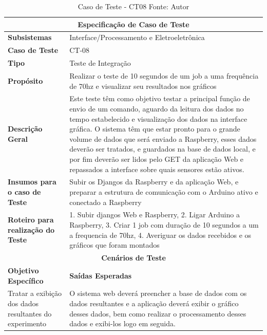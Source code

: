 \begin{table}[H]
    \begin{center}
        \begin{tabular}{|p{5cm}|p{12cm}|}
            \hline
            \multicolumn{2}{|c|}{\textbf{Especificação de Caso de Teste}} \\ \hline
                \textbf{Subsistemas}                               &  Interface/Processamento e Eletroeletrônica  \\ \hline
                \textbf{Caso de Teste}                             & CT-08 \\ \hline
                \textbf{Tipo}                                             & Teste de Integração \\ \hline
                \textbf{Propósito}                                     & Realizar o teste de 10 segundos de um job a uma frequência de 70hz e visualizar seu resultados nos gráficos \\ \hline
                \textbf{Descrição Geral}                           & Este teste têm como objetivo testar a principal função de envio de um comando, aguardo da leitura dos dados no tempo estabelecido e visualização dos dados na interface gráfica. O sistema têm que estar pronto para o grande volume de dados que será enviado a Raspberry, esses dados deverão ser tratados, e guardados na base de dados local, e por fim deverão ser lidos pelo GET da aplicação Web e repassados a interface sobre quais sensores estão ativos. \\ \hline
                \textbf{Insumos para o caso de Teste}    & Subir os Djangos da Raspberry e da aplicação Web, e preparar a estrutura de comunicação com o Arduino ativo e conectado a Raspberry \\ \hline
                \textbf{Roteiro para realização do Teste}&  1. Subir djangos Web e Raspberry, 2. Ligar Arduino a Raspberry, 3. Criar 1 job com duração de 10 segundos a um a frequencia de 70hz, 4. Averiguar os dados recebidos e os gráficos que foram montados  \\ \hline
            \multicolumn{2}{|c|}{\textbf{Cenários de Teste}} \\ \hline
                \textbf{Objetivo Específico}                      & \textbf{Saídas Esperadas} \\ \hline
                Tratar a exibição dos dados resultantes do experimento & O sistema web deverá preencher a base de dados com os dados resultantes e a aplicação deverá exibir o gráfico desses dados, bem como realizar o processamento desses dados e exibi-los logo em seguida. \\ \hline
        \end{tabular}
    \end{center}
    \caption[Caso de Teste - CT08]{Caso de Teste - CT08
    \protect Fonte: Autor}
    \label{CT-08}
\end{table}

